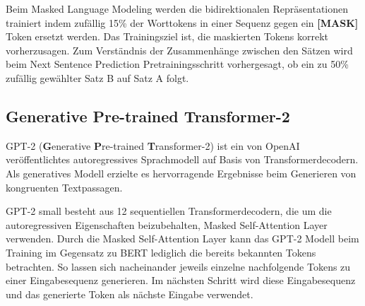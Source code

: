 Beim Masked Language Modeling werden die bidirektionalen Repräsentationen trainiert indem zufällig 15\% der Worttokens in einer Sequenz gegen ein \textbf{[MASK]} Token ersetzt werden. Das Trainingsziel ist, die maskierten Tokens korrekt vorherzusagen.
Zum Verständnis der Zusammenhänge zwischen den Sätzen wird beim Next Sentence Prediction Pretrainingsschritt vorhergesagt, ob ein zu 50\% zufällig gewählter Satz B auf Satz A folgt.

\subsection{\textbf{G}enerative \textbf{P}re-trained \textbf{T}ransformer-2}
GPT-2 (\textbf{G}enerative \textbf{P}re-trained \textbf{T}ransformer-2) ist ein von OpenAI \citep{radford2019language} veröffentlichtes autoregressives Sprachmodell auf Basis von Transformerdecodern.
Als generatives Modell erzielte es hervorragende Ergebnisse beim Generieren von kongruenten Textpassagen.

GPT-2 small besteht aus 12 sequentiellen Transformerdecodern, die um die autoregressiven Eigenschaften beizubehalten, Masked Self-Attention Layer verwenden. Durch die Masked Self-Attention Layer kann das GPT-2 Modell beim Training im Gegensatz zu BERT lediglich die bereits bekannten Tokens betrachten.
So lassen sich nacheinander jeweils einzelne nachfolgende Tokens zu einer Eingabesequenz generieren. 
Im nächsten Schritt wird diese Eingabesequenz und das generierte Token als nächste Eingabe verwendet.



\pagebreak
